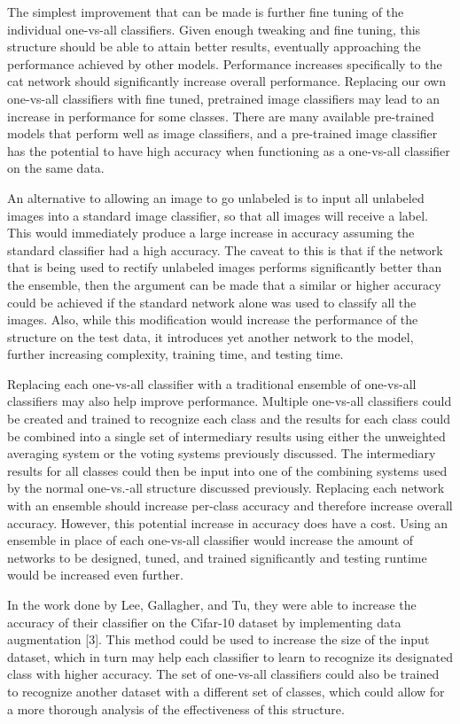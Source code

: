 \documentclass[10pt,twocolumn,letterpaper]{article}
\begin{document}
The simplest improvement that can be made is further fine tuning of the individual one-vs-all classifiers. Given enough tweaking and fine tuning, this structure should be able to attain better results, eventually approaching the performance achieved by other models. Performance increases specifically to the cat network should significantly increase overall performance. Replacing our own one-vs-all classifiers with fine tuned, pretrained image classifiers may lead to an increase in performance for some classes. There are many available pre-trained models that perform well as image classifiers, and a pre-trained image classifier has the potential to have high accuracy when functioning as a one-vs-all classifier on the same data.

An alternative to allowing an image to go unlabeled is to input all unlabeled images into a standard image classifier, so that all images will receive a label. This would immediately produce a large increase in accuracy assuming the standard classifier had a high accuracy. The caveat to this is that if the network that is being used to rectify unlabeled images performs significantly better than the ensemble, then the argument can be made that a similar or higher accuracy could be achieved if the standard network alone was used to classify all the images. Also, while this modification would increase the performance of the structure on the test data, it introduces yet another network to the model, further increasing complexity, training time, and testing time.

Replacing each one-vs-all classifier with a traditional ensemble of one-vs-all classifiers may also help improve performance. Multiple one-vs-all classifiers could be created and trained to recognize each class and the results for each class could be combined into a single set of intermediary results using either the unweighted averaging system or the voting systems previously discussed. The intermediary results for all classes could then be input into one of the combining systems used by the normal one-vs.-all structure discussed previously. Replacing each network with an ensemble should increase per-class accuracy and therefore increase overall accuracy. However, this potential increase in accuracy does have a cost. Using an ensemble in place of each one-vs-all classifier would increase the amount of networks to be designed, tuned, and trained significantly and testing runtime would be increased even further.

In the work done by Lee, Gallagher, and Tu,  they were able to increase the accuracy of their classifier on the Cifar-10 dataset by implementing data augmentation [3]. This method could be used to increase the size of the input dataset, which in turn may help each classifier to learn to recognize its designated class with higher accuracy. The set of one-vs-all classifiers could also be trained to recognize another dataset with a different set of classes, which could allow for a more thorough analysis of the effectiveness of this structure.
\end{document}
